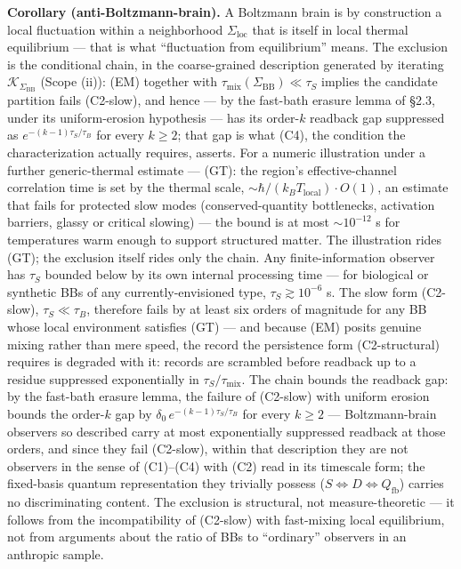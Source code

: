 \documentclass[
]{article}
\begin{document}
\textbf{Corollary (anti-Boltzmann-brain).} A Boltzmann brain is by
construction a local fluctuation within a neighborhood
\(\Sigma_{\text{loc}}\) that is itself in local thermal equilibrium ---
that is what ``fluctuation from equilibrium'' means. The exclusion is
the conditional chain, in the coarse-grained description generated by
iterating \(\mathcal{K}_{\Sigma_{\text{BB}}}\) (Scope (ii)): (EM)
together with \(\tau_{\text{mix}}(\Sigma_{\text{BB}}) \ll \tau_S\)
implies the candidate partition fails (C2-slow), and hence --- by the
fast-bath erasure lemma of §2.3, under its uniform-erosion hypothesis
--- has its order-\(k\) readback gap suppressed as
\(e^{-(k-1)\tau_S/\tau_B}\) for every \(k \geq 2\); that gap is what
(C4), the condition the characterization actually requires, asserts. For
a numeric illustration under a further generic-thermal estimate ---
(GT): the region's effective-channel correlation time is set by the
thermal scale, \(\sim \hbar/(k_B T_{\text{local}}) \cdot O(1)\), an
estimate that fails for protected slow modes (conserved-quantity
bottlenecks, activation barriers, glassy or critical slowing) --- the
bound is at most \(\sim 10^{-12}\) s for temperatures warm enough to
support structured matter. The illustration rides (GT); the exclusion
itself rides only the chain. Any finite-information observer has
\(\tau_S\) bounded below by its own internal processing time --- for
biological or synthetic BBs of any currently-envisioned type,
\(\tau_S \gtrsim 10^{-6}\) s. The slow form (C2-slow),
\(\tau_S \ll \tau_B\), therefore fails by at least six orders of
magnitude for any BB whose local environment satisfies (GT) --- and
because (EM) posits genuine mixing rather than mere speed, the record
the persistence form (C2-structural) requires is degraded with it:
records are scrambled before readback up to a residue suppressed
exponentially in \(\tau_S/\tau_{\text{mix}}\). The chain bounds the
readback gap: by the fast-bath erasure lemma, the failure of (C2-slow)
with uniform erosion bounds the order-\(k\) gap by
\(\delta_0\, e^{-(k-1)\tau_S/\tau_B}\) for every \(k \geq 2\) ---
Boltzmann-brain observers so described carry at most exponentially
suppressed readback at those orders, and since they fail (C2-slow),
within that description they are not observers in the sense of
(C1)--(C4) with (C2) read in its timescale form; the fixed-basis quantum
representation they trivially possess
(\(S \iff D \iff Q_{\mathrm{fb}}\)) carries no discriminating content.
The exclusion is structural, not measure-theoretic --- it follows from
the incompatibility of (C2-slow) with fast-mixing local equilibrium, not
from arguments about the ratio of BBs to ``ordinary'' observers in an
anthropic sample.
\end{document}
